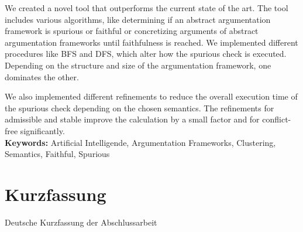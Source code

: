 \documentclass[twoside,openright]{scrreprt}
\begin{document}
We created a novel tool that outperforms the current state of the art. The tool includes various algorithms, like determining if an abstract argumentation framework is spurious or faithful or concretizing arguments of abstract argumentation frameworks until faithfulness is reached. We implemented different procedures like BFS and DFS, which alter how the spurious check is executed. Depending on the structure and size of the argumentation framework, one dominates the other.

We also implemented different refinements to reduce the overall execution time of the spurious check depending on the chosen semantics. The refinements for admissible and stable improve the calculation by a small factor and for conflict-free significantly.\\

\noindent
\textbf{Keywords:} Artificial Intelligende, Argumentation Frameworks, Clustering, Semantics, Faithful, Spurious





\chapter*{Kurzfassung}

Deutsche Kurzfassung der Abschlussarbeit


\cleardoublepage

\chapter*{}


\cleardoublepage

\tableofcontents

\listoffigures

\listoftables







\end{document}
